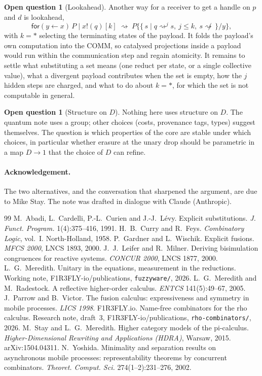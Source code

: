 \documentclass[11pt,a4paper]{article}
\theoremstyle{plain}
\theoremstyle{definition}
\newtheorem{question}[theorem]{Open question}
\theoremstyle{remark}
\newcommand{\out}[2]{#1!(#2)}
\newcommand{\rcv}[3]{\mathsf{for}(#1 \leftarrow #2)\,#3}
\newcommand{\red}{\rightsquigarrow}
\newcommand{\ssub}[2]{\{#1/#2\}}
\begin{document}
\begin{question}[Lookahead]
Another way for a receiver to get a handle on $p$ and $d$ is lookahead,
\[
  \rcv{y}{x}{P}\mid\out{x}{q}[k]\;\red\;
  P\ssub{\{\,s \mid q\red^{j}s,\ j\le k,\ s\not\red\,\}}{y},
\]
with $k=*$ selecting the terminating states of the payload. It folds the
payload's own computation into the COMM, so catalysed projections inside a
payload would run within the communication step and regain atomicity. It
remains to settle what substituting a set means (one reduct per state, or a
single collective value), what a divergent payload contributes when the set
is empty, how the $j$ hidden steps are charged, and what to do about $k=*$,
for which the set is not computable in general.
\end{question}

\begin{question}[Structure on $D$]
Nothing here uses structure on $D$. The quantum note \cite{UE} uses a group;
other choices (costs, provenance tags, types) suggest themselves. The question
is which properties of the core are stable under which choices, in particular
whether erasure at the unary drop should be parametric in a map $D\to 1$ that
the choice of $D$ can refine.
\end{question}

\paragraph{Acknowledgement.} The two alternatives, and the conversation that
sharpened the argument, are due to Mike Stay. The note was drafted in dialogue
with Claude (Anthropic).

\begin{thebibliography}{99}
 M.~Abadi, L.~Cardelli, P.-L.~Curien and J.-J.~L\'evy.
  Explicit substitutions. \emph{J. Funct. Program.} 1(4):375--416, 1991.
 H.~B.~Curry and R.~Feys. \emph{Combinatory Logic}, vol.~I.
  North-Holland, 1958.
 P.~Gardner and L.~Wischik. Explicit fusions. \emph{MFCS 2000},
  LNCS 1893, 2000.
 J.~J.~Leifer and R.~Milner. Deriving bisimulation congruences
  for reactive systems. \emph{CONCUR 2000}, LNCS 1877, 2000.
 L.~G.~Meredith. Unitary in the equations, measurement in the
  reductions. Working note, F1R3FLY-io/publications, \texttt{fuzzyware/}, 2026.
 L.~G.~Meredith and M.~Radestock. A reflective higher-order
  calculus. \emph{ENTCS} 141(5):49--67, 2005.
 J.~Parrow and B.~Victor. The fusion calculus: expressiveness and
  symmetry in mobile processes. \emph{LICS 1998}.
 F1R3FLY.io. Name-free combinators for the rho calculus.
  Research note, draft~3, F1R3FLY-io/publications, \texttt{rho-combinators/},
  2026.
 M.~Stay and L.~G.~Meredith. Higher category models of the
  pi-calculus. \emph{Higher-Dimensional Rewriting and Applications (HDRA)},
  Warsaw, 2015. arXiv:1504.04311.
 N.~Yoshida. Minimality and separation results on
  asynchronous mobile processes: representability theorems by concurrent
  combinators. \emph{Theoret. Comput. Sci.} 274(1--2):231--276, 2002.
\end{thebibliography}
\end{document}

